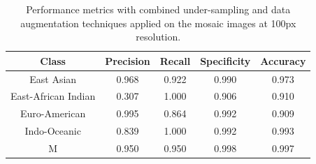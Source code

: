 \begin{table}[H]
	\centering
	\begin{tabular}{|c|c|c|c|c|}
		\hline
		\textbf{Class}      & \textbf{Precision} & \textbf{Recall} & \textbf{Specificity} & \textbf{Accuracy} \\
		\hline
		East Asian          & 0.968              & 0.922           & 0.990                & 0.973             \\
		East-African Indian & 0.307              & 1.000           & 0.906                & 0.910             \\
		Euro-American       & 0.995              & 0.864           & 0.992                & 0.909             \\
		Indo-Oceanic        & 0.839              & 1.000           & 0.992                & 0.993             \\
		M                   & 0.950              & 0.950           & 0.998                & 0.997             \\
		\hline
	\end{tabular}
	\caption{Performance metrics with combined under-sampling and data augmentation techniques applied on the mosaic images at 100px
		resolution.}
	\label{tab:combined_techniques_performance_metrics_mosaic}
\end{table}